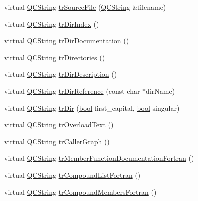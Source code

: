 \begin{DoxyCompactItemize}
\item 
virtual \hyperlink{class_q_c_string}{Q\+C\+String} \hyperlink{class_translator_danish_ac468aa253ba333d750aef289ab0a58e8}{tr\+Source\+File} (\hyperlink{class_q_c_string}{Q\+C\+String} \&filename)
\item 
virtual \hyperlink{class_q_c_string}{Q\+C\+String} \hyperlink{class_translator_danish_a78189c2d18b041d98b808b00052c8c00}{tr\+Dir\+Index} ()
\item 
virtual \hyperlink{class_q_c_string}{Q\+C\+String} \hyperlink{class_translator_danish_a879da65e434991246126ca67ed49fbb2}{tr\+Dir\+Documentation} ()
\item 
virtual \hyperlink{class_q_c_string}{Q\+C\+String} \hyperlink{class_translator_danish_a58e73287fb67094c6dc1c8824d83217f}{tr\+Directories} ()
\item 
virtual \hyperlink{class_q_c_string}{Q\+C\+String} \hyperlink{class_translator_danish_a1139152252f6ee748f8e7b4705987b16}{tr\+Dir\+Description} ()
\item 
virtual \hyperlink{class_q_c_string}{Q\+C\+String} \hyperlink{class_translator_danish_a730f238db6ef1b22b23610cd238991ec}{tr\+Dir\+Reference} (const char $\ast$dir\+Name)
\item 
virtual \hyperlink{class_q_c_string}{Q\+C\+String} \hyperlink{class_translator_danish_a3e5197e99dcf66474981d186f1b07939}{tr\+Dir} (\hyperlink{qglobal_8h_a1062901a7428fdd9c7f180f5e01ea056}{bool} first\+\_\+capital, \hyperlink{qglobal_8h_a1062901a7428fdd9c7f180f5e01ea056}{bool} singular)
\item 
virtual \hyperlink{class_q_c_string}{Q\+C\+String} \hyperlink{class_translator_danish_a610a64a8aaec8ff73acaf6c42c98433b}{tr\+Overload\+Text} ()
\item 
virtual \hyperlink{class_q_c_string}{Q\+C\+String} \hyperlink{class_translator_danish_a8e70ce804e5afc7eac9391edd2668f1f}{tr\+Caller\+Graph} ()
\item 
virtual \hyperlink{class_q_c_string}{Q\+C\+String} \hyperlink{class_translator_danish_ad261e64c39e5ba47c0100db4b88bb88a}{tr\+Member\+Function\+Documentation\+Fortran} ()
\item 
virtual \hyperlink{class_q_c_string}{Q\+C\+String} \hyperlink{class_translator_danish_a447b042d5c8092fe9458fbba01eda814}{tr\+Compound\+List\+Fortran} ()
\item 
virtual \hyperlink{class_q_c_string}{Q\+C\+String} \hyperlink{class_translator_danish_add31f1de5778df55b717465844a6dea1}{tr\+Compound\+Members\+Fortran} ()
\item 

\end{DoxyCompactItemize}
